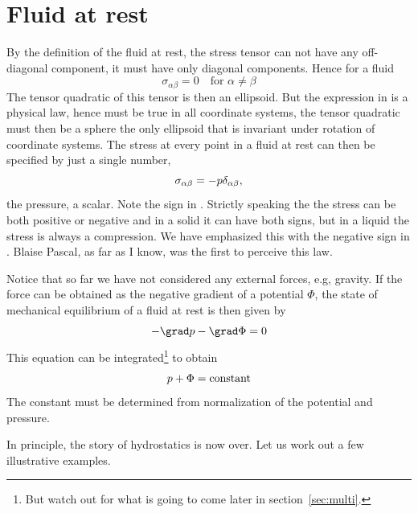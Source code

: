 \documentclass{tufte-book} %
\begin{document}
\section{Fluid at rest}
By the definition of the fluid at rest, the stress tensor can not have
any off-diagonal component, it must have only diagonal components.
Hence for a fluid 
\begin{equation}
\sigma_{\alpha\beta} = 0 \quad\text{for $\alpha\neq\beta$} 
\label{eq:statics}
\end{equation}
The tensor quadratic of this tensor is then an ellipsoid. 
But the expression in  is a physical law, hence must be true in all
coordinate systems, the tensor quadratic must then be a sphere
the only ellipsoid that is invariant under rotation of coordinate
systems. The stress at every point in a fluid at rest can then be
specified by just a single number, 
\begin{equation}
\sigma_{\alpha\beta} = -p \delta_{\alpha\beta}\/,
\label{eq:pressure}
\end{equation}
the pressure, a scalar. Note the sign in . 
Strictly speaking the the stress can be both positive or negative and
in a solid it can have both signs, but in a liquid the stress is
always a compression. We have emphasized this with the negative sign
in . Blaise Pascal, as far as I know, was the first to perceive
this law. 

Notice that so far we have not considered any external forces, e.g,
gravity.  If the force can be obtained as the negative gradient of a potential
$\Phi$, the state of mechanical equilibrium of a fluid
at rest is then given by 
\begin{equation}
-\grad p - \grad \Phi = 0 
\label{eq:fstatics}
\end{equation}
This equation can be integrated\footnote{But watch out for what is
  going to come later in section~\ref{sec:multi}.} to obtain 
\begin{equation}
p + \Phi = {\rm constant}
\label{eq:pot}
\end{equation}
The constant must be determined from normalization of the potential
and pressure. 

In principle, the story of hydrostatics is now over.  Let us work out
a few illustrative examples.
\end{document}
